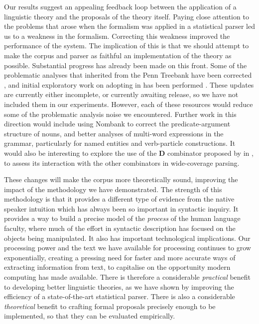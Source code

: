 Our results suggest an appealing feedback loop
between the application of a linguistic theory and the proposals of the theory
itself. Paying close attention to the problems that arose when the formalism was
applied in a statistical parser led us to a weakness in the formalism.
Correcting this weakness improved the performance of the system. The implication
of this is that we should attempt to make the corpus and parser as faithful an
implementation of the theory as possible. Substantial progress has already been
made on this front. Some of the problematic analyses that \ccgbank inherited
from the Penn Treebank have been corrected
\citep{honnibal:pacling07prop,vadas:08,white:punct08}, and initial exploratory work on
adopting \mmccg in \ccgbank has been performed \citep{tse:honours}. These
updates are currently either incomplete, or currently awaiting release, so we
have not included them in our experiments. However, each of these resources
would reduce some of the problematic analysis noise we encountered. Further work
in this direction would include using Nombank \citep{nombank} to correct the
predicate-argument structure of nouns, and better analyses of multi-word
expressions in the grammar, particularly for named entities and verb-particle
constructions. It would also be interesting to explore the use of the \textbf{D}
combinator proposed by \citet{hoyt:08} in \ccgbank, to assess its interaction
with the other \ccg combinators in wide-coverage parsing.

These changes will make the corpus more theoretically sound, improving the
impact of the methodology we have demonstrated. The strength of this methodology
is that it provides a different type of evidence from the native speaker
intuition which has always been so important in syntactic inquiry. It provides a
way to build a precise model of the \emph{process} of the human language
faculty, where much of the effort in syntactic description has focused on the
objects being manipulated. It also has important technological implications. Our
processing power and the text we have available for processing continues to grow
exponentially, creating a pressing need for faster and more accurate ways of
extracting information from text, to capitalise on the opportunity modern
computing has made available. There is therefore a considerable \emph{practical}
benefit to developing better linguistic theories, as we have shown by improving
the efficiency of a state-of-the-art statistical parser. There is also a considerable
\emph{theoretical} benefit to crafting formal proposals precisely enough to be implemented,
so that they can be evaluated empirically.


